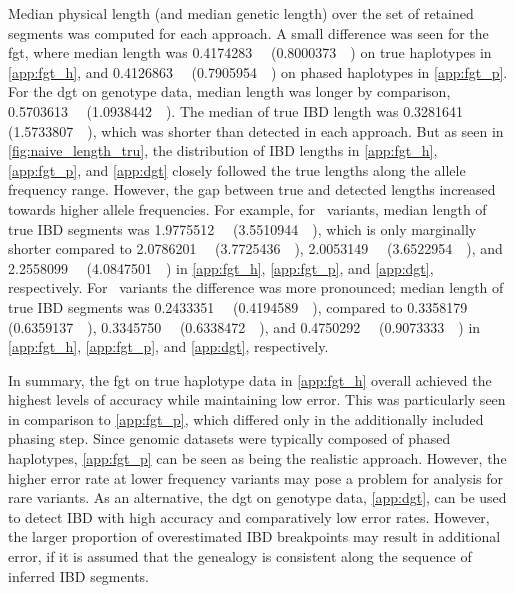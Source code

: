 Median physical length (and median genetic length) over the set of retained segments was computed for each approach.
A small difference was seen for the \gls{fgt}, where median length was
\SI{0.4174283}{\mega\basepair} (\SI{0.8000373}{\centi\morgan})
on true haplotypes in \cref{app:fgt_h}, and
\SI{0.4126863}{\mega\basepair} (\SI{0.7905954}{\centi\morgan})
on phased haplotypes in \cref{app:fgt_p}.
For the \gls{dgt} on genotype data, median length was longer by comparison, \SI{0.5703613}{\mega\basepair} (\SI{1.0938442}{\centi\morgan}).
The median of true IBD length was \SI{0.3281641}{\mega\basepair} (\SI{1.5733807}{\centi\morgan}), which was shorter than detected in each approach.
But as seen in \cref{fig:naive_length_tru}, the distribution of IBD lengths in \ref{app:fgt_h}, \ref{app:fgt_p}, and \ref{app:dgt} closely followed the true lengths along the allele frequency range.
However, the gap between true and detected lengths increased towards higher allele frequencies.
For example, for ~variants, median length of true IBD segments was
\SI{1.9775512}{\mega\basepair} (\SI{3.5510944}{\centi\morgan}),
which is only marginally shorter compared to
\SI{2.0786201}{\mega\basepair} (\SI{3.7725436}{\centi\morgan}),
\SI{2.0053149}{\mega\basepair} (\SI{3.6522954}{\centi\morgan}), and
\SI{2.2558099}{\mega\basepair} (\SI{4.0847501}{\centi\morgan})
in \ref{app:fgt_h}, \ref{app:fgt_p}, and \ref{app:dgt}, respectively.
For ~variants the difference was more pronounced; \ie
median length of true IBD segments was
\SI{0.2433351}{\mega\basepair} (\SI{0.4194589}{\centi\morgan}),
compared to
\SI{0.3358179}{\mega\basepair} (\SI{0.6359137}{\centi\morgan}),
\SI{0.3345750}{\mega\basepair} (\SI{0.6338472}{\centi\morgan}), and
\SI{0.4750292}{\mega\basepair} (\SI{0.9073333}{\centi\morgan})
in \ref{app:fgt_h}, \ref{app:fgt_p}, and \ref{app:dgt}, respectively.


In summary, the \gls{fgt} on true haplotype data in \cref{app:fgt_h} overall achieved the highest levels of accuracy while maintaining low error.
This was particularly seen in comparison to \cref{app:fgt_p}, which differed only in the additionally included phasing step.
Since genomic datasets were typically composed of phased haplotypes, \cref{app:fgt_p} can be seen as being the realistic approach.
However, the higher error rate at lower frequency variants may pose a problem for analysis for rare variants.
As an alternative, the \gls{dgt} on genotype data, \cref{app:dgt}, can be used to detect IBD with high accuracy and comparatively low error rates.
However, the larger proportion of overestimated IBD breakpoints may result in additional error, \eg if it is assumed that the genealogy is consistent along the sequence of inferred IBD segments.




